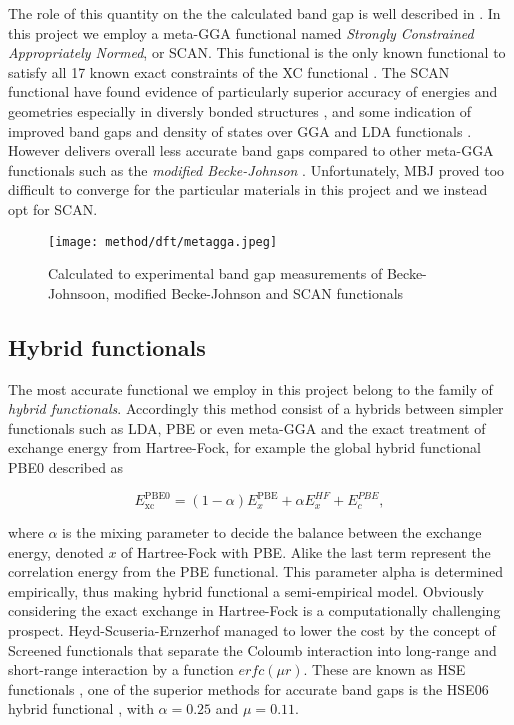 The role of this quantity on the the calculated band gap is well described in \cite{xc_kineticEnergy}. In this project we employ a meta-GGA functional named \textit{Strongly Constrained Appropriately Normed}, or SCAN. This functional is the only known functional to satisfy all 17 known exact constraints of the XC functional \cite{scan}. The SCAN functional have found evidence of particularly superior accuracy of energies and geometries especially in diversly bonded structures  \cite{scan_divbond}, and some indication of improved band gaps and density of states over GGA and LDA functionals \cite{scan_pbe}. However delivers overall less accurate band gaps compared to other meta-GGA functionals such as the \textit{modified Becke-Johnson} \cite{mbj}. Unfortunately, MBJ proved too difficult to converge for the particular materials in this project and we instead opt for SCAN. 
\begin{figure}[H]
\centering
\texttt{[image: method/dft/metagga.jpeg]}
\caption{Calculated to experimental band gap measurements of Becke-Johnsoon, modified Becke-Johnson and SCAN functionals \cite{xc_benchmark}}
\end{figure}

\subsection{Hybrid functionals}

The most accurate functional we employ in this project belong to the family of \textit{hybrid functionals}. Accordingly this method consist of a hybrids between simpler functionals such as LDA, PBE or even meta-GGA and the exact treatment of exchange energy from Hartree-Fock, for example the global hybrid functional PBE0 \cite{pbe0} described as

\begin{equation}
E_\text{xc} ^\text{PBE0} = (1-\alpha)E_x ^\text{PBE} + \alpha E_x ^{HF} + E_c ^{PBE}, 
\end{equation}

 where $\alpha$ is the mixing parameter to decide the balance between the exchange energy, denoted $x$ of Hartree-Fock with PBE. Alike the last term represent the correlation energy from the PBE functional. This parameter alpha is determined empirically, thus making hybrid functional a semi-empirical model. Obviously considering the exact exchange in Hartree-Fock is a computationally challenging prospect. Heyd-Scuseria-Ernzerhof managed to lower the cost by the concept of Screened functionals that separate the Coloumb interaction into long-range and short-range interaction by a function $erfc(\mu r)$. These are known as HSE functionals \cite{hse}, one of the superior methods for accurate band gaps is the HSE06 hybrid functional \cite{hse06}, with $\alpha = 0.25$ and $\mu = 0.11$.  
 
